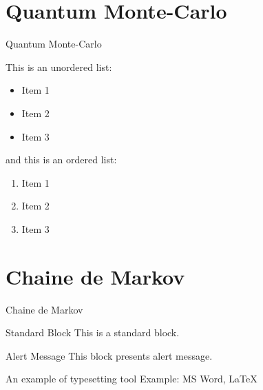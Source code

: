 \documentclass[beamer]{standalone}
\begin{document}
    \section{Quantum Monte-Carlo}
    \begin{frame}{Quantum Monte-Carlo}

    This is an unordered list:
    \begin{itemize}
        \item Item 1
        \item Item 2
        \item Item 3
    \end{itemize}

    and this is an ordered list:
    \begin{enumerate}
        \item Item 1
        \item Item 2
        \item Item 3
    \end{enumerate}

    \end{frame}


    \section{Chaine de Markov}
    \begin{frame}{Chaine de Markov}
        \begin{block}{Standard Block}
            This is a standard block.
        \end{block}
        \begin{alertblock}{Alert Message}
            This block presents alert message.
        \end{alertblock}
        \begin{exampleblock}{An example of typesetting tool}
            Example: MS Word, \LaTeX{}
        \end{exampleblock}
    \end{frame}
\end{document}
